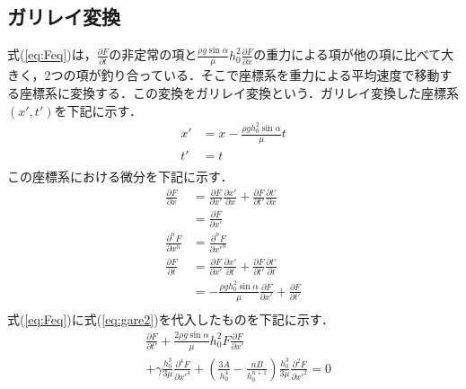 \documentclass[autodetect-engine,dvipdfmx-if-dvi,ja=standard,a4paper,11pt]{bxjsarticle} %
\begin{document}
\subsection{ガリレイ変換}
式(\ref{eq:Feq})は，$\frac{\partial F}{\partial t}$の非定常の項と$\frac{\rho g\sin\alpha}{\mu}h_0^2\frac{\partial F}{\partial x}$の重力による項が他の項に比べて大きく，2つの項が釣り合っている．そこで座標系を重力による平均速度で移動する座標系に変換する．この変換をガリレイ変換という．ガリレイ変換した座標系$(x',t')$を下記に示す．
\begin{equation}
\begin{split}
x'&=x-\frac{\rho gh_0^2\sin\alpha}{\mu}t\\
t'&=t\\
\end{split}
\label{eq:gare1}
\end{equation}
この座標系における微分を下記に示す．
\begin{equation}
\begin{split}
\frac{\partial F}{\partial x}&=\frac{\partial F}{\partial x'}\frac{\partial x'}{\partial x}+\frac{\partial F}{\partial t'}\frac{\partial t'}{\partial x}\\
&=\frac{\partial F}{\partial x'}\\
\frac{\partial^n F}{\partial x^n}&=\frac{\partial^n F}{\partial x'^n}\\
\frac{\partial F}{\partial t}&=\frac{\partial F}{\partial x'}\frac{\partial x'}{\partial t}+\frac{\partial F}{\partial t'}\frac{\partial t'}{\partial t}\\
&=-\frac{\rho gh_0^2\sin\alpha}{\mu}\frac{\partial F}{\partial x'}+\frac{\partial F}{\partial t'}\\
\end{split}
\label{eq:gare2}
\end{equation}
式(\ref{eq:Feq})に式(\ref{eq:gare2})を代入したものを下記に示す．
\begin{equation}
\begin{split}
&\frac{\partial F}{\partial t'}+\frac{2\rho g\sin\alpha}{\mu}h_0^2F\frac{\partial F}{\partial x'}\\
&+\gamma\frac{h_0^3}{3\mu}\frac{\partial^4 F}{\partial x'^4}+\left(\frac{3A}{h_0^4}-\frac{nB}{h_0^{n+1}}\right)\frac{h_0^3}{3\mu}\frac{\partial^2 F}{\partial x'^2}=0
\label{eq:Feq2}
\end{split}
\end{equation}
\end{document}
